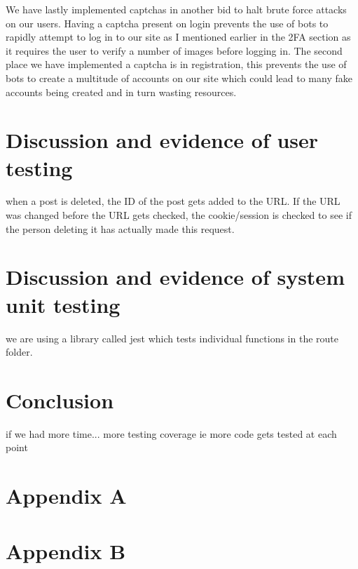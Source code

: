 \documentclass{ueacmpstyle}
\begin{document}
        We have lastly implemented captchas in another bid to halt brute force attacks on our users. Having a captcha present on login prevents the use of bots to rapidly attempt to log in to our site as I mentioned earlier in the 2FA section as it requires the user to verify a number of images before logging in. The second place we have implemented a captcha is in registration, this prevents the use of bots to create a multitude of accounts on our site which could lead to many fake accounts being created and in turn wasting resources.

        
        


    \section{Discussion and evidence of user testing}
    
    when a post is deleted, the ID of the post gets added to the URL. If the URL was changed before the URL gets checked, the cookie/session is checked to see if the person deleting it has actually made this request.
    
    \section{Discussion and evidence of system unit testing}
        
    we are using a library called jest which tests individual functions in the route folder.    
    
    
    
    \section{Conclusion}\label{sec:Con}
    
    if we had more time...
    more testing coverage ie more code gets tested at each point
    
    
	
	
	\newpage
	\appendix
        \section{Appendix A}\label{app:A}   %
            \newpage
        \section{Appendix B}\label{app:B}
\end{document}
